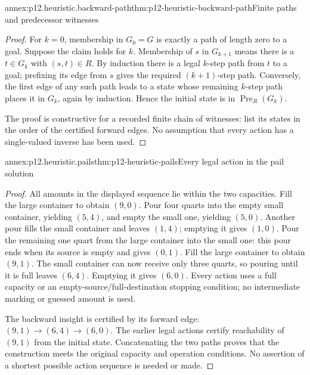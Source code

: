 \begin{annexitem}{annex:p12.heuristic.backward-path}{thm:p12-heuristic-backward-path}{Finite paths and predecessor witnesses}
\begin{proof}
For \(k=0\), membership in \(G_0=G\) is exactly a path of
length zero to a goal. Suppose the claim holds for \(k\).
Membership of \(s\) in \(G_{k+1}\) means there is a \(t\in G_k\)
with \((s,t)\in R\). By induction there is a legal \(k\)-step
path from \(t\) to a goal; prefixing its edge from \(s\) gives
the required \((k+1)\)-step path. Conversely, the first edge
of any such path leads to a state whose remaining \(k\)-step
path places it in \(G_k\), again by induction. Hence the
initial state is in \(\operatorname{Pre}_R(G_k)\).

The proof is constructive for a recorded finite chain of
witnesses: list its states in the order of the certified forward
edges. No assumption that every action has a single-valued inverse
has been used.
\end{proof}
\end{annexitem}

\begin{annexitem}{annex:p12.heuristic.pails}{thm:p12-heuristic-pails}{Every legal action in the pail solution}
\begin{proof}
All amounts in the displayed sequence lie within the two capacities.
Fill the large container to obtain \((9,0)\). Pour four quarts
into the empty small container, yielding \((5,4)\), and empty
the small one, yielding \((5,0)\). Another pour fills the small
container and leaves \((1,4)\); emptying it gives \((1,0)\).
Pour the remaining one quart from the large container into the
small one: this pour ends when its source is empty and gives
\((0,1)\). Fill the large container to obtain \((9,1)\).
The small container can now receive only three quarts, so pouring
until it is full leaves \((6,4)\). Emptying it gives \((6,0)\).
Every action uses a full capacity or an empty-source/full-destination
stopping condition; no intermediate marking or guessed amount is used.

The backward insight is certified by its forward edge:
\((9,1)\to(6,4)\to(6,0)\). The earlier legal actions certify
reachability of \((9,1)\) from the initial state. Concatenating
the two paths proves that the construction meets the original
capacity and operation conditions. No assertion of a shortest
possible action sequence is needed or made.
\end{proof}
\end{annexitem}

